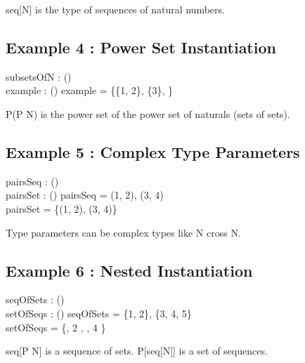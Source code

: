 \documentclass[a4paper,10pt,fleqn]{article}
\begin{document}
\noindent seq[N] is the type of sequences of natural numbers.

\bigskip

\subsection*{Example 4 : Power Set Instantiation}

\begin{axdef}
subsetsOfN : \power (\power \nat) \\
example : \power (\power \nat)
\where
example = \{\{1, 2\}, \{3\}, \emptyset[\nat]\}
\end{axdef}

\noindent P(P N) is the power set of the power set of naturals (sets of sets).

\bigskip

\subsection*{Example 5 : Complex Type Parameters}

\begin{axdef}
pairsSeq : \seq (\nat \cross \nat) \\
pairsSet : \power (\nat \cross \nat)
\where
pairsSeq = \langle (1, 2), (3, 4) \rangle \\
pairsSet = \{(1, 2), (3, 4)\}
\end{axdef}

\noindent Type parameters can be complex types like N cross N.

\bigskip

\subsection*{Example 6 : Nested Instantiation}

\begin{axdef}
seqOfSets : \seq (\power \nat) \\
setOfSeqs : \power (\seq \nat)
\where
seqOfSets = \langle \{1, 2\}, \{3, 4, 5\} \rangle \\
setOfSeqs = \{, 2 \rangle, , 4 \rangle\}
\end{axdef}

\noindent seq[P N] is a sequence of sets. P[seq[N]] is a set of sequences.
\end{document}
